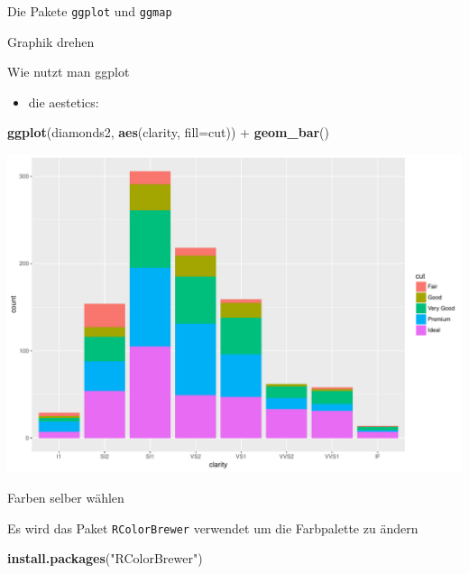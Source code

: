 \documentclass[ignorenonframetext,]{beamer}
\newenvironment{Shaded}{}{}
\newcommand{\KeywordTok}[1]{\textcolor[rgb]{0.00,0.44,0.13}{\textbf{{#1}}}}
\newcommand{\DataTypeTok}[1]{\textcolor[rgb]{0.56,0.13,0.00}{{#1}}}
\newcommand{\StringTok}[1]{\textcolor[rgb]{0.25,0.44,0.63}{{#1}}}
\newcommand{\NormalTok}[1]{{#1}}
\providecommand{\tightlist}{%
\setlength{\itemsep}{0pt}\setlength{\parskip}{0pt}}
\begin{document}
\begin{frame}[fragile]{Die Pakete \texttt{ggplot} und \texttt{ggmap}}
\begin{block}{Graphik drehen}
\end{block}

\begin{block}{Wie nutzt man ggplot}

\begin{itemize}
\tightlist
\item
  die aestetics:
\end{itemize}

\begin{Shaded}
\begin{Highlighting}[]
\KeywordTok{ggplot}\NormalTok{(diamonds2, }\KeywordTok{aes}\NormalTok{(clarity, }\DataTypeTok{fill=}\NormalTok{cut)) +}\StringTok{ }\KeywordTok{geom_bar}\NormalTok{()}
\end{Highlighting}
\end{Shaded}

\includegraphics{R_intern_files/figure-beamer/unnamed-chunk-245-1.pdf}

\end{block}

\begin{block}{Farben selber wählen}

Es wird das Paket \texttt{RColorBrewer} verwendet um die Farbpalette zu
ändern

\begin{Shaded}
\begin{Highlighting}[]
\KeywordTok{install.packages}\NormalTok{(}\StringTok{"RColorBrewer"}\NormalTok{)}
\end{Highlighting}
\end{Shaded}


\end{block}
\end{frame}
\end{document}
